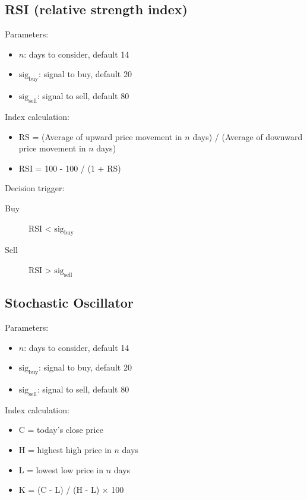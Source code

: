 \documentclass{article}
\begin{document}
\subsection{RSI (relative strength index)}

Parameters\cite{stock-market-prediction-model-using-TPWS}:
\begin{itemize}
    \item $n$: days to consider, default 14
    \item $\text{sig}_{\text{buy}}$: signal to buy, default 20
    \item $\text{sig}_{\text{sell}}$: signal to sell, default 80
\end{itemize}

Index calculation:
\begin{itemize}
    \item RS = (Average of upward price movement in $n$ days) / (Average of downward price movement in $n$ days)
    \item RSI = 100 - 100 / (1 + RS)
\end{itemize}

Decision trigger:
\begin{description}
    \item[Buy] RSI < $\text{sig}_{\text{buy}}$
    \item[Sell] RSI > $\text{sig}_{\text{sell}}$
\end{description}


\subsection{Stochastic Oscillator}

Parameters\cite{stock-market-prediction-model-using-TPWS}:
\begin{itemize}
    \item $n$: days to consider, default 14
    \item $\text{sig}_{\text{buy}}$: signal to buy, default 20
    \item $\text{sig}_{\text{sell}}$: signal to sell, default 80
\end{itemize}

Index calculation:
\begin{itemize}
    \item C = today's close price
    \item H = highest high price in $n$ days
    \item L = lowest low price in $n$ days
    \item K = (C - L) / (H - L) $\times$ 100
\end{itemize}
\end{document}
